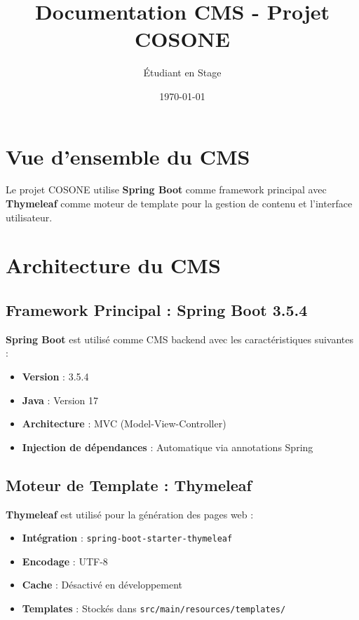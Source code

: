 \documentclass[12pt,a4paper]{article}
\title{\textbf{Documentation CMS - Projet COSONE}}
\author{Étudiant en Stage}
\date{\today}
\begin{document}
\maketitle

\section{Vue d'ensemble du CMS}

Le projet COSONE utilise \textbf{Spring Boot} comme framework principal avec \textbf{Thymeleaf} comme moteur de template pour la gestion de contenu et l'interface utilisateur.

\section{Architecture du CMS}

\subsection{Framework Principal : Spring Boot 3.5.4}

\textbf{Spring Boot} est utilisé comme CMS backend avec les caractéristiques suivantes :
\begin{itemize}
    \item \textbf{Version} : 3.5.4
    \item \textbf{Java} : Version 17
    \item \textbf{Architecture} : MVC (Model-View-Controller)
    \item \textbf{Injection de dépendances} : Automatique via annotations Spring
\end{itemize}

\subsection{Moteur de Template : Thymeleaf}

\textbf{Thymeleaf} est utilisé pour la génération des pages web :
\begin{itemize}
    \item \textbf{Intégration} : \texttt{spring-boot-starter-thymeleaf}
    \item \textbf{Encodage} : UTF-8
    \item \textbf{Cache} : Désactivé en développement
    \item \textbf{Templates} : Stockés dans \texttt{src/main/resources/templates/}
\end{itemize}
\end{document}
